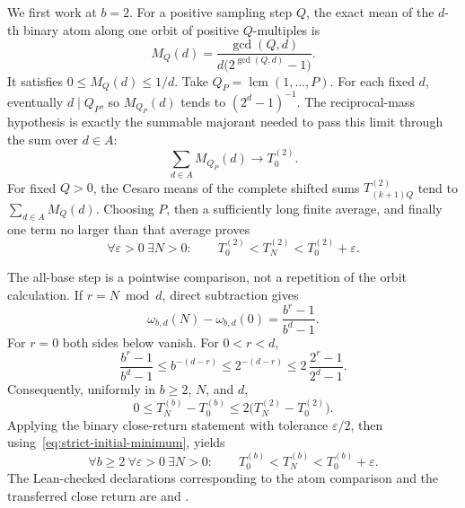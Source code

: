 \documentclass[11pt]{article}
\begin{document}
We first work at \(b=2\).  For a positive sampling step \(Q\), the exact mean
of the \(d\)-th binary atom along one orbit of positive \(Q\)-multiples is
\[
 M_Q(d)=\frac{\gcd(Q,d)}{d\bigl(2^{\gcd(Q,d)}-1\bigr)}.
 \tag{4}\label{eq:gcd-orbit-mean}
\]
It satisfies \(0\le M_Q(d)\le1/d\).  Take
\(Q_P=\operatorname{lcm}(1,\ldots,P)\).  For each fixed \(d\), eventually
\(d\mid Q_P\), so \(M_{Q_P}(d)\) tends to \((2^d-1)^{-1}\).
The reciprocal-mass hypothesis is exactly the summable majorant needed to
pass this limit through the sum over \(d\in A\):
\[
 \sum_{d\in A}M_{Q_P}(d)\longrightarrow T_0^{(2)}.
 \tag{5}\label{eq:lcm-prefix-orbit-limit}
\]
For fixed \(Q>0\), the Cesaro means of the complete shifted sums
\(T_{(k+1)Q}^{(2)}\) tend to \(\sum_{d\in A}M_Q(d)\).  Choosing \(P\), then a
sufficiently long finite average, and finally one term no larger than that
average proves
\[
 \forall\varepsilon>0\ \exists N>0:\qquad
  T_0^{(2)}<T_N^{(2)}<T_0^{(2)}+\varepsilon.
 \tag{6}\label{eq:strict-close-return}
\]

The all-base step is a pointwise comparison, not a repetition of the orbit
calculation.  If \(r=N\bmod d\), direct subtraction gives
\[
 \omega_{b,d}(N)-\omega_{b,d}(0)
   =\frac{b^r-1}{b^d-1}.
\]
For \(r=0\) both sides below vanish.  For \(0<r<d\),
\[
 \frac{b^r-1}{b^d-1}
 \le b^{-(d-r)}
 \le 2^{-(d-r)}
 \le 2\,\frac{2^r-1}{2^d-1}.
\]
Consequently, uniformly in \(b\ge2\), \(N\), and \(d\),
\[
 0\le T_N^{(b)}-T_0^{(b)}
 \le2\bigl(T_N^{(2)}-T_0^{(2)}\bigr).
 \tag{7}\label{eq:binary-radix-transfer}
\]
Applying the binary close-return statement with tolerance
\(\varepsilon/2\), then using~\eqref{eq:strict-initial-minimum}, yields
\[
 \forall b\ge2\ \forall\varepsilon>0\ \exists N>0:\qquad
 T_0^{(b)}<T_N^{(b)}<T_0^{(b)}+\varepsilon.
 \tag{8}\label{eq:all-base-close-return}
\]
The Lean-checked declarations corresponding to the atom comparison and the
transferred close return are
and
.
\end{document}
